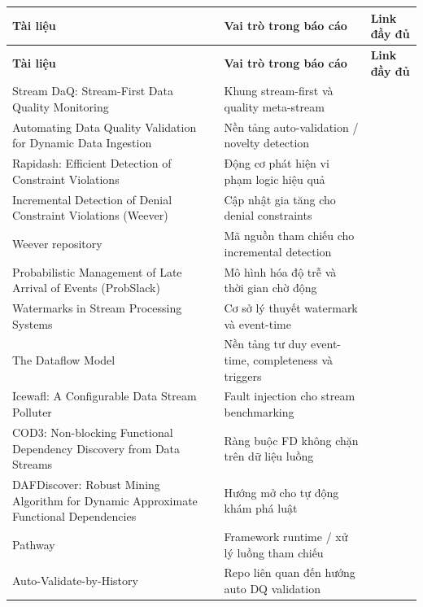{\small
\setlength{\tabcolsep}{4pt}
\begin{longtable}{|L{0.29\textwidth}|L{0.20\textwidth}|L{0.37\textwidth}|}
\hline
\textbf{Tài liệu} & \textbf{Vai trò trong báo cáo} & \textbf{Link đầy đủ} \\
\hline
\endfirsthead
\hline
\textbf{Tài liệu} & \textbf{Vai trò trong báo cáo} & \textbf{Link đầy đủ} \\
\hline
\endhead
Stream DaQ: Stream-First Data Quality Monitoring & Khung stream-first và quality meta-stream &  \\
\hline
Automating Data Quality Validation for Dynamic Data Ingestion & Nền tảng auto-validation / novelty detection &  \\
\hline
Rapidash: Efficient Detection of Constraint Violations & Động cơ phát hiện vi phạm logic hiệu quả &  \\
\hline
Incremental Detection of Denial Constraint Violations (Weever) & Cập nhật gia tăng cho denial constraints &  \\
\hline
Weever repository & Mã nguồn tham chiếu cho incremental detection &  \\
\hline
Probabilistic Management of Late Arrival of Events (ProbSlack) & Mô hình hóa độ trễ và thời gian chờ động &  \\
\hline
Watermarks in Stream Processing Systems & Cơ sở lý thuyết watermark và event-time &  \\
\hline
The Dataflow Model & Nền tảng tư duy event-time, completeness và triggers &  \\
\hline
Icewafl: A Configurable Data Stream Polluter & Fault injection cho stream benchmarking &  \\
\hline
COD3: Non-blocking Functional Dependency Discovery from Data Streams & Ràng buộc FD không chặn trên dữ liệu luồng &  \\
\hline
DAFDiscover: Robust Mining Algorithm for Dynamic Approximate Functional Dependencies & Hướng mở cho tự động khám phá luật &  \\
\hline
Pathway & Framework runtime / xử lý luồng tham chiếu &  \\
\hline
Auto-Validate-by-History & Repo liên quan đến hướng auto DQ validation &  \\
\hline
\end{longtable}
}

